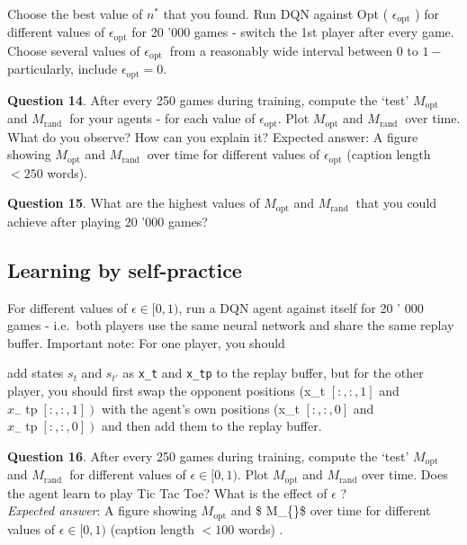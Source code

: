 \documentclass[11pt]{article}
\begin{document}
Choose the best value of \(n^{*}\) that you found. Run DQN against Opt (
\(\epsilon_{\mathrm{opt}}\) ) for different values of
\(\epsilon_{\mathrm{opt}}\) for 20 '000 games - switch the 1st player
after every game. Choose several values of \(\epsilon_{\text {opt }}\)
from a reasonably wide interval between 0 to \(1-\) particularly,
include \(\epsilon_{\mathrm{opt}}=0\).

\textbf{Question 14}. After every 250 games during training, compute the
`test' \(M_{\text {opt }}\) and \(M_{\text {rand }}\) for your agents -
for each value of \(\epsilon_{\mathrm{opt}}\). Plot \(M_{\mathrm{opt}}\)
and \(M_{\text {rand }}\) over time. What do you observe? How can you
explain it? Expected answer: A figure showing \(M_{\mathrm{opt}}\) and
\(M_{\text {rand }}\) over time for different values of
\(\epsilon_{\mathrm{opt}}\) (caption length \(<250\) words).

\textbf{Question 15}. What are the highest values of
\(M_{\mathrm{opt}}\) and \(M_{\text {rand }}\) that you could achieve
after playing 20 '000 games?

    \hypertarget{learning-by-self-practice}{%
\subsection{Learning by self-practice}\label{learning-by-self-practice}}

    For different values of \(\epsilon \in[0,1)\), run a DQN agent against
itself for 20 ' 000 games - i.e.~both players use the same neural
network and share the same replay buffer. Important note: For one
player, you should

add states \(s_t\) and \(s_{t'}\) as \texttt{x\_t} and \texttt{x\_tp} to
the replay buffer, but for the other player, you should first swap the
opponent positions (x\_t \([:,:, 1]\) and
\(\left.x_{-} \operatorname{tp}[:,:, 1]\right)\) with the agent's own
positions (x\_t \([:,:, 0]\) and
\(\left.x_{-} \operatorname{tp}[:,:, 0]\right)\) and then add them to
the replay buffer.

\textbf{Question 16}. After every 250 games during training, compute the
`test' \(M_{\text {opt }}\) and \(M_{\text {rand }}\) for different
values of \(\epsilon \in[0,1)\). Plot \(M_{\mathrm{opt}}\) and
\(M_{\mathrm{rand}}\) over time. Does the agent learn to play Tic Tac
Toe? What is the effect of \(\epsilon\) ?\\
\emph{Expected answer}: A figure showing \(M_{\mathrm{opt}}\) and \$
M\_\{\}\$ over time for different values of
\(\epsilon \in[0,1)\) (caption length \(<100\) words) .
\end{document}
